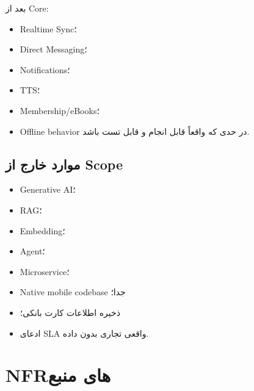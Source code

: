 بعد از Core:
\begin{itemize}
  \item Realtime Sync؛
  \item Direct Messaging؛
  \item Notifications؛
  \item TTS؛
  \item Membership/eBooks؛
  \item Offline behavior در حدی که واقعاً قابل انجام و قابل تست باشد.
\end{itemize}

\subsection{موارد خارج از Scope}

\begin{itemize}
  \item Generative AI؛
  \item RAG؛
  \item Embedding؛
  \item Agent؛
  \item Microservice؛
  \item Native mobile codebase جدا؛
  \item ذخیره اطلاعات کارت بانکی؛
  \item ادعای SLA واقعی تجاری بدون داده.
\end{itemize}

\section{NFRهای منبع}

